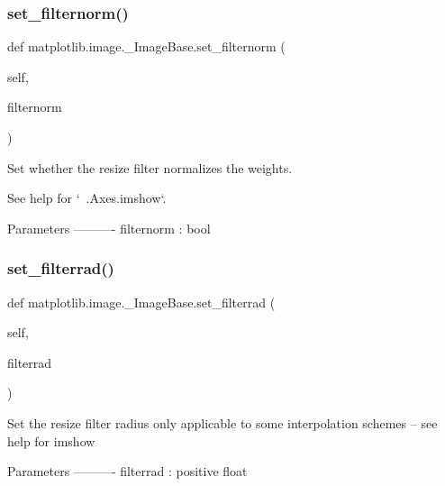 \subsubsection{\texorpdfstring{set\+\_\+filternorm()}{set\_filternorm()}}
{\footnotesize\ttfamily def matplotlib.\+image.\+\_\+\+Image\+Base.\+set\+\_\+filternorm (\begin{DoxyParamCaption}\item[{}]{self,  }\item[{}]{filternorm }\end{DoxyParamCaption})}

\begin{DoxyVerb}Set whether the resize filter normalizes the weights.

See help for `~.Axes.imshow`.

Parameters
----------
filternorm : bool
\end{DoxyVerb}
 \mbox{\label{classmatplotlib_1_1image_1_1__ImageBase_a203619a893439987530488669fc6ad44}} 
\subsubsection{\texorpdfstring{set\+\_\+filterrad()}{set\_filterrad()}}
{\footnotesize\ttfamily def matplotlib.\+image.\+\_\+\+Image\+Base.\+set\+\_\+filterrad (\begin{DoxyParamCaption}\item[{}]{self,  }\item[{}]{filterrad }\end{DoxyParamCaption})}

\begin{DoxyVerb}Set the resize filter radius only applicable to some
interpolation schemes -- see help for imshow

Parameters
----------
filterrad : positive float
\end{DoxyVerb}
 \mbox{\label{classmatplotlib_1_1image_1_1__ImageBase_a6378a7f0017f9b7c0b5de5ca21dcfb5d}} 
